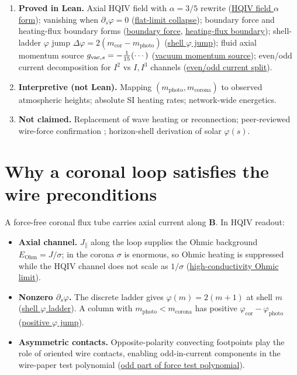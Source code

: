 \documentclass[11pt]{amsart}
\begin{document}
\begin{enumerate}[leftmargin=2em]
\item \textbf{Proved in Lean.}
  Axial HQIV field with $\alpha=3/5$ rewrite
  (\hyperref[lean:hqiv-field-alpha]{HQIV field $\alpha$ form});
  vanishing when $\partial_s\varphi=0$
  (\hyperref[lean:flat-limit]{flat-limit collapse});
  boundary force and heating-flux boundary forms
  (\hyperref[lean:boundary-force]{boundary force},
  \hyperref[lean:heating-flux]{heating-flux boundary});
  shell-ladder $\varphi$ jump $\Delta\varphi=2(m_{\mathrm{cor}}-m_{\mathrm{photo}})$
  (\hyperref[lean:phi-jump]{shell $\varphi$ jump});
  fluid axial momentum source $g_{{\rm vac},s}=-\frac{1}{15}(\cdots)$
  (\hyperref[lean:vacuum-momentum]{vacuum momentum source});
  even/odd current decomposition for $I^2$ vs $I,I^3$ channels
  (\hyperref[lean:even-odd]{even/odd current split}).
\item \textbf{Interpretive (not Lean).}
  Mapping $(m_{\mathrm{photo}},m_{\mathrm{corona}})$ to observed atmospheric
  heights; absolute SI heating rates; network-wide energetics.
\item \textbf{Not claimed.}
  Replacement of wave heating or reconnection; peer-reviewed wire-force
  confirmation \cite{graneau2026}; horizon-shell derivation of solar $\varphi(s)$.
\end{enumerate}

\section{Why a coronal loop satisfies the wire preconditions}
\label{sec:geometry}

A force-free coronal flux tube carries axial current along $\mathbf B$.
In HQIV readout:

\begin{itemize}[leftmargin=2em]
\item \textbf{Axial channel.}
  $J_\parallel$ along the loop supplies the Ohmic background
  $E_{\mathrm{Ohm}}=J/\sigma$; in the corona $\sigma$ is enormous, so Ohmic
  heating is suppressed while the HQIV channel does not scale as $1/\sigma$
  (\hyperref[lean:ohmic-suppression]{high-conductivity Ohmic limit}).
\item \textbf{Nonzero $\partial_s\varphi$.}
  The discrete ladder gives $\varphi(m)=2(m+1)$ at shell $m$
  (\hyperref[lean:phi-of-shell]{shell $\varphi$ ladder}). A column with
  $m_{\mathrm{photo}}<m_{\mathrm{corona}}$ has positive
  $\varphi_{\mathrm{cor}}-\varphi_{\mathrm{photo}}$
  (\hyperref[lean:phi-jump-pos]{positive $\varphi$ jump}).
\item \textbf{Asymmetric contacts.}
  Opposite-polarity convecting footpoints play the role of oriented wire
  contacts, enabling odd-in-current components in the wire-paper test polynomial
  (\hyperref[lean:test-poly-odd]{odd part of force test polynomial}).
\end{itemize}
\end{document}
